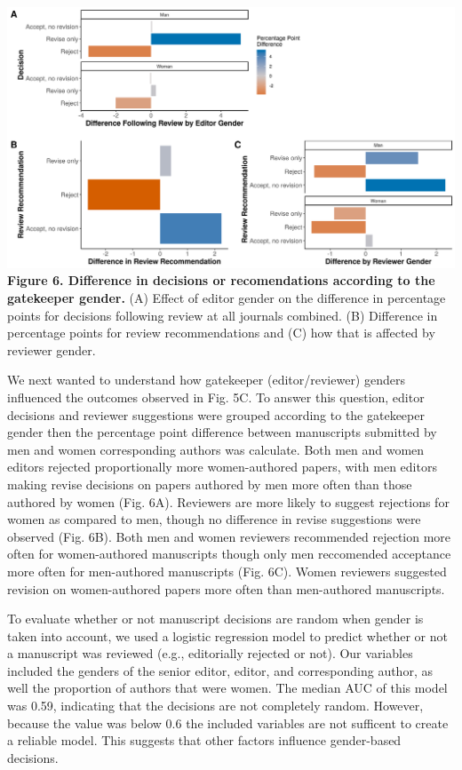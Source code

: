 \documentclass[11pt,]{article}
\begin{document}
\includegraphics{Figure_6.png} \textbf{Figure 6. Difference in decisions
or recomendations according to the gatekeeper gender.} (A) Effect of
editor gender on the difference in percentage points for decisions
following review at all journals combined. (B) Difference in percentage
points for review recommendations and (C) how that is affected by
reviewer gender.

We next wanted to understand how gatekeeper (editor/reviewer) genders
influenced the outcomes observed in Fig. 5C. To answer this question,
editor decisions and reviewer suggestions were grouped according to the
gatekeeper gender then the percentage point difference between
manuscripts submitted by men and women corresponding authors was
calculate. Both men and women editors rejected proportionally more
women-authored papers, with men editors making revise decisions on
papers authored by men more often than those authored by women (Fig.
6A). Reviewers are more likely to suggest rejections for women as
compared to men, though no difference in revise suggestions were
observed (Fig. 6B). Both men and women reviewers recommended rejection
more often for women-authored manuscripts though only men reccomended
acceptance more often for men-authored manuscripts (Fig. 6C). Women
reviewers suggested revision on women-authored papers more often than
men-authored manuscripts.

To evaluate whether or not manuscript decisions are random when gender
is taken into account, we used a logistic regression model to predict
whether or not a manuscript was reviewed (e.g., editorially rejected or
not). Our variables included the genders of the senior editor, editor,
and corresponding author, as well the proportion of authors that were
women. The median AUC of this model was 0.59, indicating that the
decisions are not completely random. However, because the value was
below 0.6 the included variables are not sufficent to create a reliable
model. This suggests that other factors influence gender-based
decisions.
\end{document}
